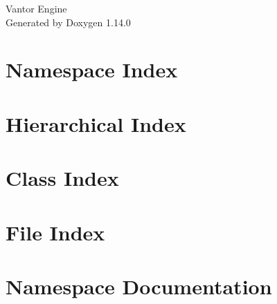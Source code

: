 \documentclass[twoside]{book}
\newcommand{\+}{\discretionary{\mbox{\scriptsize$\hookleftarrow$}}{}{}}
\newcommand{\clearemptydoublepage}{%
    \newpage{\pagestyle{empty}\cleardoublepage}%
  }
\begin{document}
  \raggedbottom
    \hypersetup{pageanchor=false,
                bookmarksnumbered=true,
                pdfencoding=unicode
               }
  \begin{titlepage}
  \vspace*{7cm}
  \begin{center}%
  {\Large Vantor Engine}\\
  \vspace*{1cm}
  {\large Generated by Doxygen 1.14.0}\\
  \end{center}
  \end{titlepage}
  \clearemptydoublepage
  \tableofcontents
  \clearemptydoublepage
  \hypersetup{pageanchor=true}
\chapter{Namespace Index}

\chapter{Hierarchical Index}

\chapter{Class Index}

\chapter{File Index}

\chapter{Namespace Documentation}


























\end{document}
